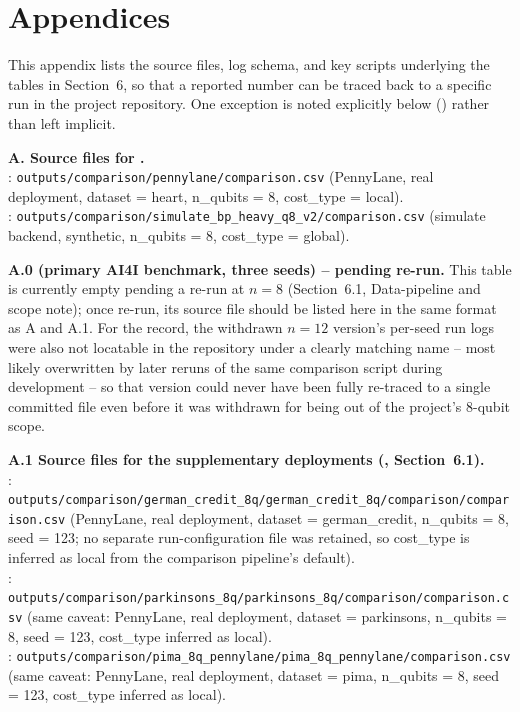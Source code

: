\section{Appendices}
This appendix lists the source files, log schema, and key scripts underlying the tables in Section~6, so that a reported number can be traced back to a specific run in the project repository. One exception is noted explicitly below () rather than left implicit.

\textbf{A. Source files for .} \\
: \texttt{outputs/comparison/pennylane/comparison.csv} (PennyLane, real deployment, dataset = heart, n\_qubits = 8, cost\_type = local). \\
: \texttt{outputs/comparison/simulate\_bp\_heavy\_q8\_v2/comparison.csv} (simulate backend, synthetic, n\_qubits = 8, cost\_type = global).

\textbf{A.0  (primary AI4I benchmark, three seeds) -- pending re-run.} This table is currently empty pending a re-run at $n=8$ (Section~6.1, Data-pipeline and scope note); once re-run, its source file should be listed here in the same format as A and A.1. For the record, the withdrawn $n=12$ version's per-seed run logs were also not locatable in the repository under a clearly matching name -- most likely overwritten by later reruns of the same comparison script during development -- so that version could never have been fully re-traced to a single committed file even before it was withdrawn for being out of the project's 8-qubit scope.

\textbf{A.1 Source files for the supplementary deployments (, Section~6.1).} \\
: \texttt{outputs/comparison/german\_credit\_8q/german\_credit\_8q/comparison/comparison.csv} (PennyLane, real deployment, dataset = german\_credit, n\_qubits = 8, seed = 123; no separate run-configuration file was retained, so cost\_type is inferred as local from the comparison pipeline's default). \\
: \texttt{outputs/comparison/parkinsons\_8q/parkinsons\_8q/comparison/comparison.csv} (same caveat: PennyLane, real deployment, dataset = parkinsons, n\_qubits = 8, seed = 123, cost\_type inferred as local). \\
: \texttt{outputs/comparison/pima\_8q\_pennylane/pima\_8q\_pennylane/comparison.csv} (same caveat: PennyLane, real deployment, dataset = pima, n\_qubits = 8, seed = 123, cost\_type inferred as local).

